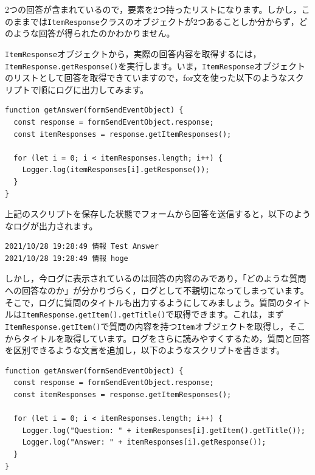 \documentclass[uplatex,a4j]{jsarticle}
\begin{document}
2つの回答が含まれているので，要素を2つ持ったリストになります。しかし，このままでは\verb|ItemResponse|クラスのオブジェクトが2つあることしか分からず，どのような回答が得られたのかわかりません。


\verb|ItemResponse|オブジェクトから，実際の回答内容を取得するには，\verb|ItemResponse.getResponse()|を実行します。いま，\verb|ItemResponse|オブジェクトのリストとして回答を取得できていますので，for文を使った以下のようなスクリプトで順にログに出力してみます。

\begin{lstlisting}[basicstyle=\ttfamily\footnotesize,frame=single,caption=Event Object sample 3]
function getAnswer(formSendEventObject) {
  const response = formSendEventObject.response;
  const itemResponses = response.getItemResponses();
  
  for (let i = 0; i < itemResponses.length; i++) {
    Logger.log(itemResponses[i].getResponse());
  }
}
\end{lstlisting}

上記のスクリプトを保存した状態でフォームから回答を送信すると，以下のようなログが出力されます。


\begin{lstlisting}[basicstyle=\ttfamily\footnotesize,frame=single,caption=Event Object output example 2]
2021/10/28 19:28:49	情報 Test Answer
2021/10/28 19:28:49	情報 hoge
\end{lstlisting}

しかし，今ログに表示されているのは回答の内容のみであり，「どのような質問への回答なのか」が分かりづらく，ログとして不親切になってしまっています。
そこで，ログに質問のタイトルも出力するようにしてみましょう。質問のタイトルは\verb|ItemResponse.getItem().getTitle()|で取得できます。これは，まず\verb|ItemResponse.getItem()|で質問の内容を持つ\verb|Item|オブジェクトを取得し，そこからタイトルを取得しています。ログをさらに読みやすくするため，質問と回答を区別できるような文言を追加し，以下のようなスクリプトを書きます。

\begin{lstlisting}[basicstyle=\ttfamily\footnotesize,frame=single,caption=Event Object sample 4]
function getAnswer(formSendEventObject) {
  const response = formSendEventObject.response;
  const itemResponses = response.getItemResponses();
  
  for (let i = 0; i < itemResponses.length; i++) {
    Logger.log("Question: " + itemResponses[i].getItem().getTitle());
    Logger.log("Answer: " + itemResponses[i].getResponse());
  }
}
\end{lstlisting}
\end{document}

